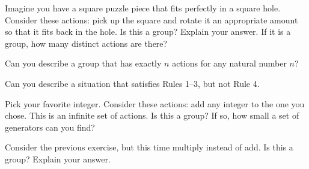 \begin{exercise}
Imagine you have a square puzzle piece that fits perfectly in a square hole.  Consider these actions: pick up the square and rotate it an appropriate amount so that it fits back in the hole.  Is this a group?  Explain your answer.  If it is a group, how many distinct actions are there?
\end{exercise}

\begin{exercise}
Can you describe a group that has exactly $n$ actions for any natural number $n$?
\end{exercise}

\begin{exercise}
Can you describe a situation that satisfies Rules 1--3, but not Rule 4.
\end{exercise}

\begin{exercise}\label{exer:introducing_Z}%
Pick your favorite integer.  Consider these actions: add any integer to the one you chose.  This is an infinite set of actions.  Is this a group?  If so, how small a set of generators can you find?
\end{exercise}

\begin{exercise}
Consider the previous exercise, but this time multiply instead of add.  Is this a group?  Explain your answer.
\end{exercise}